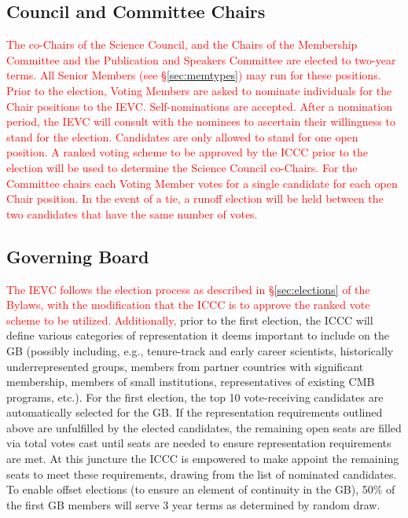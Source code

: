 \documentclass[12pt]{article}
\begin{document}
\subsection{Council and Committee Chairs}
\textcolor{red}{The co-Chairs of the Science Council, and the Chairs of the Membership Committee and the Publication and Speakers Committee are elected to two-year terms. All Senior Members (see \S\ref{sec:memtypes}) may  run for these positions.  Prior to the election, Voting Members are asked to nominate individuals for the Chair positions to the IEVC.   Self-nominations are accepted.
After a nomination period, the IEVC will consult with the nominees to ascertain their willingness to stand for the election. Candidates are only allowed to stand for one open position. 
A ranked voting scheme to be approved by the ICCC prior to the election will be used to determine the Science Council co-Chairs. For the Committee chairs each Voting Member votes for a single candidate for each open Chair position. In the event of a tie, a runoff election will be held between the two candidates that have the same number of votes. }


\subsection{Governing Board}
\textcolor{red}{The IEVC follows the election process as described in \S\ref{sec:elections} of the Bylaws, with the modification that the ICCC is to approve the ranked vote scheme to be utilized. Additionally,} prior to the first election, the ICCC will define various categories of representation it deems important to include on the GB (possibly including, e.g., tenure-track and early career scientists,  historically underrepresented groups, members from partner countries with significant membership, members of small institutions, representatives of existing CMB programs, etc.). For the first election, the top 10 vote-receiving candidates are automatically selected for the GB. If the representation requirements outlined above are unfulfilled by the elected candidates, the remaining open seats are filled via total votes cast until seats are needed to ensure representation requirements are met. At this juncture the  ICCC is empowered to make appoint the remaining seats to meet these requirements, drawing from the list of nominated candidates. 
To enable offset elections (to ensure an element of continuity in the GB), 50\% of the first GB members will serve 3 year terms as determined by random draw. 
\end{document}
